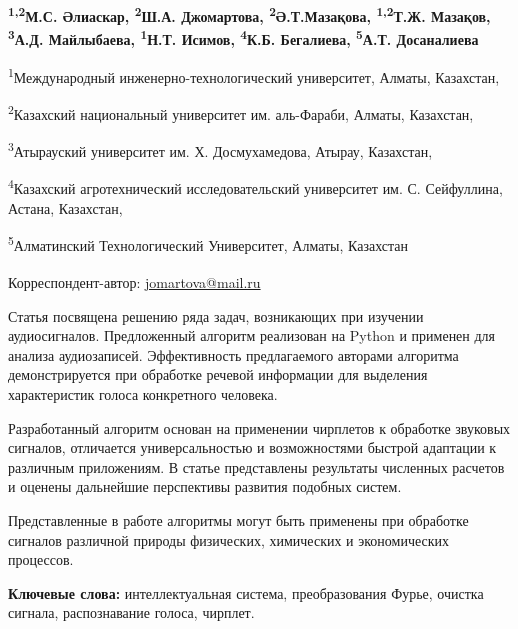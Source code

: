 
\begin{articleheader}

{\bfseries
\textsuperscript{1,2}М.С. Әлиаскар,
\textsuperscript{2}Ш.А. Джомартова\textsuperscript{\envelope },
\textsuperscript{2}Ә.Т.Мазақова,
\textsuperscript{1,2}Т.Ж. Мазақов,
\textsuperscript{3}А.Д. Майлыбаева,
\textsuperscript{1}Н.Т. Исимов,
\textsuperscript{4}К.Б. Бегалиева,
\textsuperscript{5}А.Т. Досаналиева
}
\end{articleheader}

\begin{affiliation}
\textsuperscript{1}Международный инженерно-технологический университет, Алматы, Казахстан,

\textsuperscript{2}Казахский национальный университет им. аль-Фараби, Алматы, Казахстан,

\textsuperscript{3}Атырауский университет им. Х. Досмухамедова, Атырау, Казахстан,

\textsuperscript{4}Казахский агротехнический исследовательский университет им. С. Сейфуллина, Астана, Казахстан,

\textsuperscript{5}Алматинский Технологический Университет, Алматы, Казахстан

\raggedright \textsuperscript{\envelope } Корреспондент-автор: \href{mailto:jomartova@mail.ru}{jomartova@mail.ru}
\end{affiliation}

Статья посвящена решению ряда задач, возникающих при изучении
аудиосигналов. Предложенный алгоритм реализован на Python и применен для
анализа аудиозаписей. Эффективность предлагаемого авторами алгоритма
демонстрируется при обработке речевой информации для выделения
характеристик голоса конкретного человека.

Разработанный алгоритм основан на применении чирплетов к обработке
звуковых сигналов, отличается универсальностью и возможностями быстрой
адаптации к различным приложениям. В статье представлены результаты
численных расчетов и оценены дальнейшие перспективы развития подобных
систем.

Представленные в работе алгоритмы могут быть применены при обработке
сигналов различной природы физических, химических и экономических
процессов.

{\bfseries Ключевые слова:} интеллектуальная система, преобразования Фурье,
очистка сигнала, распознавание голоса, чирплет.

